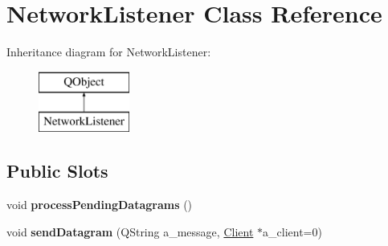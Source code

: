 \hypertarget{class_network_listener}{}\section{Network\+Listener Class Reference}
\label{class_network_listener}
Inheritance diagram for Network\+Listener\+:\begin{figure}[H]
\begin{center}
\leavevmode
\includegraphics[height=2.000000cm]{class_network_listener}
\end{center}
\end{figure}
\subsection*{Public Slots}
\begin{DoxyCompactItemize}
\item 
\hypertarget{class_network_listener_a831238cc68f68ecac14a9a5b3d330f1b}{}void {\bfseries process\+Pending\+Datagrams} ()\label{class_network_listener_a831238cc68f68ecac14a9a5b3d330f1b}

\item 
\hypertarget{class_network_listener_a99aa1b32a4f64ad0c2d651b2a5ac9325}{}void {\bfseries send\+Datagram} (Q\+String a\+\_\+message, \hyperlink{struct_client}{Client} $\ast$a\+\_\+client=0)\label{class_network_listener_a99aa1b32a4f64ad0c2d651b2a5ac9325}

\end{DoxyCompactItemize}
